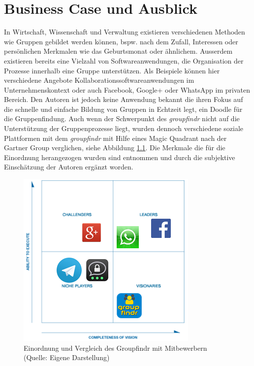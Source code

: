\chapter{Business Case und Ausblick}
\label{business_case}

In Wirtschaft, Wissenschaft und Verwaltung existieren verschiedenen Methoden wie Gruppen gebildet werden können, bspw. nach dem Zufall, Interessen oder persönlichen Merkmalen wie das Geburtsmonat oder ähnlichem. Ausserdem existieren bereits eine Vielzahl von Softwareanwendungen, die Organisation der Prozesse innerhalb eine Gruppe unterstützen. Als Beispiele können hier verschiedene Angebote Kollaborationssoftwareanwendungen im Unternehmenskontext oder auch Facebook, Google+ oder WhatsApp im privaten Bereich. Den Autoren ist jedoch keine Anwendung bekannt die ihren Fokus auf die schnelle und einfache Bildung von Gruppen in Echtzeit legt, ein Doodle für die Gruppenfindung. 
\newline\newline
Auch wenn der Schwerpunkt des \emph{groupfindr} nicht auf die Unterstützung der Gruppenprozesse liegt, wurden dennoch verschiedene soziale Plattformen mit dem \emph{groupfindr} mit Hilfe eines Magic Quadrant nach der Gartner Group \citet{magic_quadrant} verglichen, siehe Abbildung \ref{magic_quadrant}.  Die Merkmale die für die Einordnung herangezogen wurden sind \citet{gruppen-bildung} entnommen und durch die subjektive Einschätzung der Autoren ergänzt worden.

\begin{figure}[h]
\centering
\includegraphics{graphiken/magic_quadrant.png}%
\caption{Einordnung und Vergleich des Groupfindr mit Mitbewerbern (Quelle: Eigene Darstellung)}%
\label{magic_quadrant}%
\end{figure}

